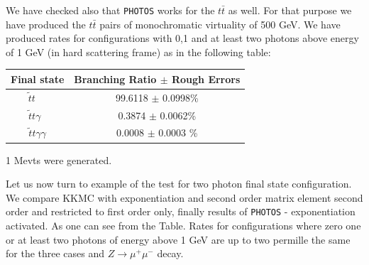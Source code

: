 \documentclass[]{Photos_interface_design}
\begin{document}
We have checked also that {\tt PHOTOS} works for the $t \bar t$ as well.
For that purpose we have produced the  $t \bar t$ pairs of monochromatic 
virtuality of 500 GeV. We have produced rates for configurations with 0,1 and 
at least two photons above energy of 1 GeV (in hard scattering frame)
as in the following table:


\vspace{0.3cm} 
\begin{center}
{ \begin{tabular}{|c|c |} 
\hline 
Final state &  Branching Ratio  $\pm$ Rough Errors \\  
\hline 
\hline 
{$ \widetilde{t} t \; \;\; \;$}  &  {99.6118 $\pm$  0.0998\%}  \\ 
\hline 
 {$  \widetilde{t} t \gamma \;\;$} &   { 0.3874 $\pm$  0.0062\%}   \\ 
\hline 
{$  \widetilde{t} t \gamma \gamma$}  &  { 0.0008 $\pm$  0.0003 \%}  \\ 
\hline 
\end{tabular} 
}  
\end{center} 
1 Mevts were generated. 

Let us now turn to example of the test for two photon final state configuration.
We compare KKMC \cite{kkcpc:1999} with exponentiation and second order matrix element 
second order and restricted to first order only, finally results of {\tt PHOTOS} - exponentiation activated. As one can see from the Table. Rates for configurations 
where zero one or at least two photons of energy above 1 GeV are up to two
permille the same for the three cases and $Z\to \mu^+\mu^-$ decay. 
\end{document}
